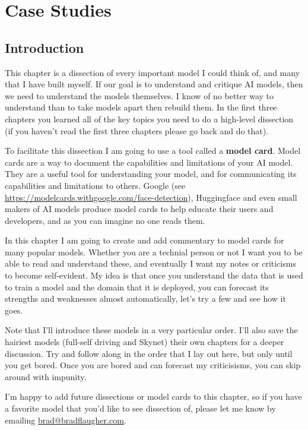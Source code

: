 \setchapterpreamble[u]{\margintoc}
\chapter{Case Studies}


\section{Introduction}

This chapter is a dissection of every important model I could think of, and many that I have built myself. If our goal is to understand and critique AI models, then we need to understand the models themselves. I know of no better way to understand than to take models apart then rebuild them. In the first three chapters you learned all of the key topics you need to do a high-level dissection (if you haven't read the first three chapters please go back and do that). 

To facilitate this dissection I am going to use a tool called a \textbf{model card}. Model cards are a way to document the capabilities and limitations of your AI model. They are a useful tool for understanding your model, and for communicating its capabilities and limitations to others. Google (see \url{https://modelcards.withgoogle.com/face-detection}), Huggingface and even small makers of AI models produce model cards to help educate their users and developers, and as you can imagine no one reads them. 

In this chapter I am going to create and add commentary to model cards for many popular models. Whether you are a technial person or not I want you to be able to read and understand these, and eventually I want my notes or criticisms to become self-evident. My idea is that once you understand the data that is used to train a model and the domain that it is deployed, you can forecast its strengths and weaknesses almost automatically, let's try a few and see how it goes.

Note that I'll introduce these models in a very particular order. I'll also save the hairiest models (full-self driving and Skynet) their own chapters for a deeper discussion. Try and follow along in the order that I lay out here, but only until you get bored. Once you are bored and can forecast my criticisisms, you can skip around with impunity.

I'm happy to add future dissections or model cards to this chapter, so if you have a favorite model that you'd like to see dissection of, please let me know by emailing \href{mailto:brad@bradflaugher.com}{brad@bradflaugher.com}.


